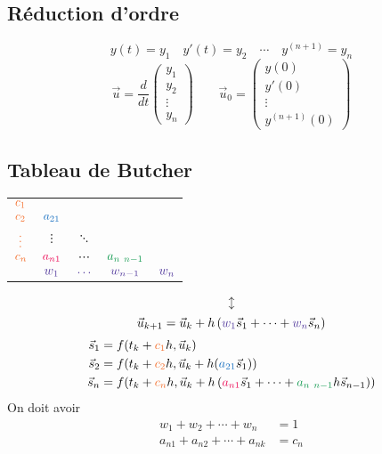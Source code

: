 \documentclass[resume]{subfiles}
\begin{document}
\subsection{Réduction d'ordre}
$$y(t)=y_1\quad y'(t)=y_2\quad \cdots \quad y^{(n+1)}=y_{n}$$
$$\vec{u}=\frac{d}{dt}\begin{pmatrix}
y_1\\
y_2\\
\vdots\\
y_n
\end{pmatrix}\qquad \vec{u}_0=\begin{pmatrix}
y(0)\\
y'(0)\\
\vdots\\
y^{(n+1)}(0)
\end{pmatrix}$$



\subsection{Tableau de Butcher}
\begin{table}[H]
\centering
\begin{tabular}{c|cccc}
$\textcolor{Orange}{c_1}$ & \\
$\textcolor{Orange}{c_2}$ & $\textcolor{RoyalBlue}{a_{21}}$\\
$\textcolor{Orange}{\vdots}$ & $\vdots$ & $\ddots$\\
$\textcolor{Orange}{c_n}$ & $\textcolor{OrangeRed}{a_{n1}}$ & $\cdots$ & $\textcolor{ForestGreen}{a_{n\ n-1}}$\\\hline
 & $\textcolor{Violet}{w_1}$ & $\textcolor{Violet}{\cdots}$ &$\textcolor{Violet}{w_{n-1}}$ &  $\textcolor{Violet}{w_n}$
\end{tabular}
\end{table}
$$\updownarrow$$
$$\vec{u}_{k+1}=\vec{u}_k+h\left(\textcolor{Violet}{w_1}\vec{s}_1+\cdots+\textcolor{Violet}{w_n}\vec{s}_n\right)$$
\begin{align*}
\vec{s}_1&=f(t_k+\textcolor{Orange}{c_1}h,\vec{u}_k)\\
\vec{s}_2&=f(t_k+\textcolor{Orange}{c_2}h,\vec{u}_k+h(\textcolor{RoyalBlue}{a_{21}}\vec{s}_1))\\
\vec{s}_n&=f(t_k+\textcolor{Orange}{c_n}h,\vec{u}_k+h\left(\textcolor{OrangeRed}{a_{n1}}\vec{s}_1+\cdots+\textcolor{ForestGreen}{a_{n\ n-1}}h\vec{s}_{n-1}\right))
\end{align*}
On doit avoir
\begin{align*}
w_1+w_2+\cdots+w_n&=1\\
a_{n1}+a_{n2}+\cdots+a_{nk}&=c_n
\end{align*}
\end{document}
